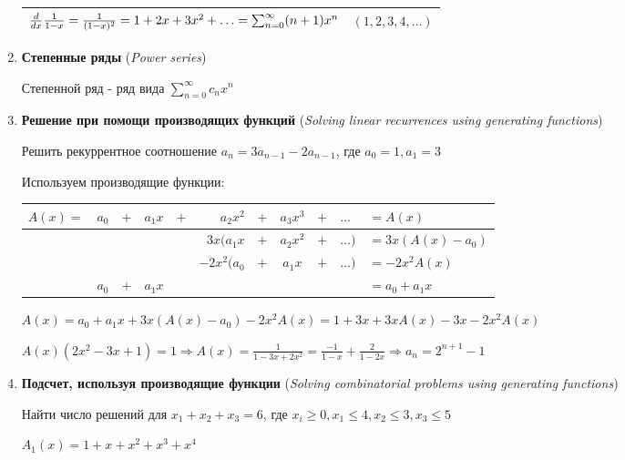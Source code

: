 \documentclass[12pt]{article}
\begin{document}
\begin{enumerate}
{\begin{tabular}{p{}|p{}}
            $\frac{d}{dx}\frac{1}{1 - x} = \frac{1}{(1 - x)^2} = 1 + 2x + 3x^2 + \dots \hfill = \sum_{n = 0}^{\infty} (n + 1) x^n$ & $(1, 2, 3, 4, \dots)$ \\\hline

        \end{tabular}
        }

        \item \textbf{Степенные ряды} (\textit{Power series})

        Степенной ряд - ряд вида $\sum_{n = 0}^\infty c_n x^n$

        \item \textbf{Решение при помощи производящих функций} (\textit{Solving linear recurrences using generating functions})

        Решить рекуррентное соотношение $a_n = 3a_{n-1} - 2a_{n-1}$, где $a_0 = 1, a_1 = 3$

        Используем производящие функции:

        \setlength{\tabcolsep}{2pt}
        \begin{tabular}{cccrcrcccll}
            $A(x) = $ & $a_0$ & $+$ & $a_1 x$ & $+$ & $a_2 x^2$    & $+$ & $a_3 x^3$ & $+$ & $\dots$  &  $ = A(x)$                  \\ \hline
             &       &     &         &     & $3x(a_1 x$   & $+$ & $a_2 x^2$ & $+$ & $\dots)$ & $= 3x(A(x) - a_0)$ \\
                   &       &     &         &     & $-2x^2(a_0 $ & $+$ & $a_1 x$   & $+$ & $\dots)$ & $= -2x^2 A(x)$     \\
                   & $a_0$ & $+$ & $a_1 x$ &     &              &     &           &     &          & $= a_0 + a_1 x$
        \end{tabular}

        $A(x) = a_0 + a_1 x + 3x(A(x) - a_0) - 2x^2 A(x) = 1 + 3x + 3xA(x) - 3x - 2x^2 A(x)$

        $A(x) (2x^2 - 3x + 1) = 1 \Longrightarrow A(x) = \frac{1}{1 - 3x + 2x^2} = \frac{-1}{1 - x} + \frac{2}{1 - 2x} \Longrightarrow a_n = 2^{n + 1} - 1$

        \item \textbf{Подсчет, используя производящие функции} (\textit{Solving combinatorial problems using generating functions})
        
        Найти число решений для $x_1 + x_2 + x_3 = 6$, где $x_i \geq 0, x_1 \leq 4, x_2 \leq 3, x_3 \leq 5$

        $A_1(x) = 1 + x + x^2 + x^3 + x^4$


\end{enumerate}
\end{document}
